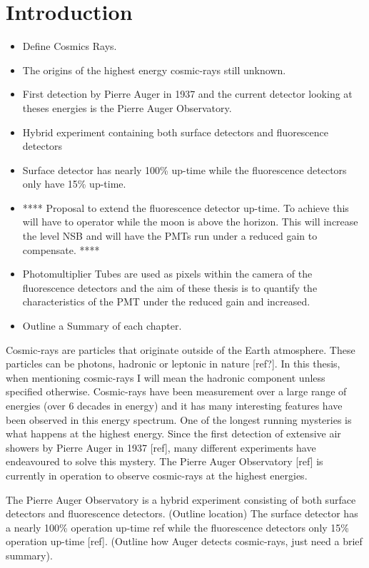 \chapter*{\centering Introduction \\}\label{Ch:Intro}

\begin{itemize}
\item Define Cosmics Rays.
\item The origins of the highest energy cosmic-rays still unknown.
\item First detection by Pierre Auger in 1937 and the current detector looking at theses energies is the Pierre Auger Observatory.
\item Hybrid experiment containing both surface detectors and fluorescence detectors
\item Surface detector has nearly 100\% up-time while the fluorescence detectors only have 15\% up-time.
\item **** Proposal to extend the fluorescence detector up-time. To achieve this will have to operator while the moon is above the horizon. This will increase the level NSB and will have the PMTs run under a reduced gain to compensate. ****
\item Photomultiplier Tubes are used as pixels within the camera of the fluorescence detectors and  the aim of these thesis is to quantify the characteristics of the PMT under the reduced gain and increased.
\item Outline a Summary of each chapter.
\end{itemize}


Cosmic-rays are particles that originate outside of the Earth atmosphere. These particles can be photons, hadronic or leptonic in nature [ref?]. In this thesis, when mentioning cosmic-rays I will mean the hadronic component unless specified otherwise. Cosmic-rays have been measurement over a large range of energies (over 6 decades in energy) and it has many interesting features have been observed in this energy spectrum. One of the longest running mysteries is what happens at the highest energy. Since the first detection of extensive air showers by Pierre Auger in 1937 [ref], many different experiments have endeavoured to solve this mystery. The Pierre Auger Observatory [ref] is currently in operation to observe cosmic-rays at the highest energies. 

The Pierre Auger Observatory is a hybrid experiment consisting of both surface detectors and fluorescence detectors. (Outline location) The surface detector has a nearly 100\% operation up-time {ref} while the fluorescence detectors only 15\% operation up-time [ref]. (Outline how Auger detects cosmic-rays, just need a brief summary).

